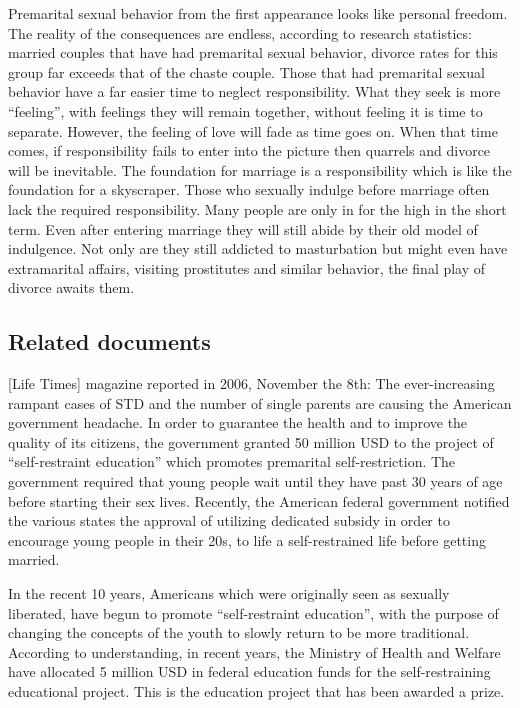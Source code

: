 \documentclass[
]{book}
\begin{document}
Premarital sexual behavior from the first appearance looks like personal freedom. The reality of the consequences are endless, according to research statistics: married couples that have had premarital sexual behavior, divorce rates for this group far exceeds that of the chaste couple. Those that had premarital sexual behavior have a far easier time to neglect responsibility. What they seek is more ``feeling'', with feelings they will remain together, without feeling it is time to separate. However, the feeling of love will fade as time goes on. When that time comes, if responsibility fails to enter into the picture then quarrels and divorce will be inevitable. The foundation for marriage is a responsibility which is like the foundation for a skyscraper. Those who sexually indulge before marriage often lack the required responsibility. Many people are only in for the high in the short term. Even after entering marriage they will still abide by their old model of indulgence. Not only are they still addicted to masturbation but might even have extramarital affairs, visiting prostitutes and similar behavior, the final play of divorce awaits them.

\hypertarget{related-documents}{%
\subsection{Related documents}\label{related-documents}}

{[}Life Times{]} magazine reported in 2006, November the 8th: The ever-increasing rampant cases of STD and the number of single parents are causing the American government headache. In order to guarantee the health and to improve the quality of its citizens, the government granted 50 million USD to the project of ``self-restraint education'' which promotes premarital self-restriction. The government required that young people wait until they have past 30 years of age before starting their sex lives. Recently, the American federal government notified the various states the approval of utilizing dedicated subsidy in order to encourage young people in their 20s, to life a self-restrained life before getting married.

In the recent 10 years, Americans which were originally seen as sexually liberated, have begun to promote ``self-restraint education'', with the purpose of changing the concepts of the youth to slowly return to be more traditional. According to understanding, in recent years, the Ministry of Health and Welfare have allocated 5 million USD in federal education funds for the self-restraining educational project. This is the education project that has been awarded a prize.
\end{document}
